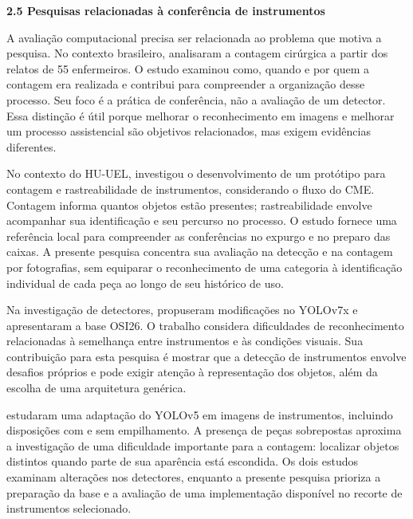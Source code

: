 \vspace{\baselineskip}
{}
\noindent\textbf{2.5 Pesquisas relacionadas à conferência de instrumentos}\par
\vspace{\baselineskip}

A avaliação computacional precisa ser relacionada ao problema que motiva a pesquisa. No contexto brasileiro, \textcite{freitas2016} analisaram a contagem cirúrgica a partir dos relatos de 55 enfermeiros. O estudo examinou como, quando e por quem a contagem era realizada e contribui para compreender a organização desse processo. Seu foco é a prática de conferência, não a avaliação de um detector. Essa distinção é útil porque melhorar o reconhecimento em imagens e melhorar um processo assistencial são objetivos relacionados, mas exigem evidências diferentes.

No contexto do HU-UEL, \textcite{moreto2025} investigou o desenvolvimento de um protótipo para contagem e rastreabilidade de instrumentos, considerando o fluxo do CME. Contagem informa quantos objetos estão presentes; rastreabilidade envolve acompanhar sua identificação e seu percurso no processo. O estudo fornece uma referência local para compreender as conferências no expurgo e no preparo das caixas. A presente pesquisa concentra sua avaliação na detecção e na contagem por fotografias, sem equiparar o reconhecimento de uma categoria à identificação individual de cada peça ao longo de seu histórico de uso.

Na investigação de detectores, \textcite{ran2023} propuseram modificações no YOLOv7x e apresentaram a base OSI26. O trabalho considera dificuldades de reconhecimento relacionadas à semelhança entre instrumentos e às condições visuais. Sua contribuição para esta pesquisa é mostrar que a detecção de instrumentos envolve desafios próprios e pode exigir atenção à representação dos objetos, além da escolha de uma arquitetura genérica.

\textcite{jiang2023} estudaram uma adaptação do YOLOv5 em imagens de instrumentos, incluindo disposições com e sem empilhamento. A presença de peças sobrepostas aproxima a investigação de uma dificuldade importante para a contagem: localizar objetos distintos quando parte de sua aparência está escondida. Os dois estudos examinam alterações nos detectores, enquanto a presente pesquisa prioriza a preparação da base e a avaliação de uma implementação disponível no recorte de instrumentos selecionado.

